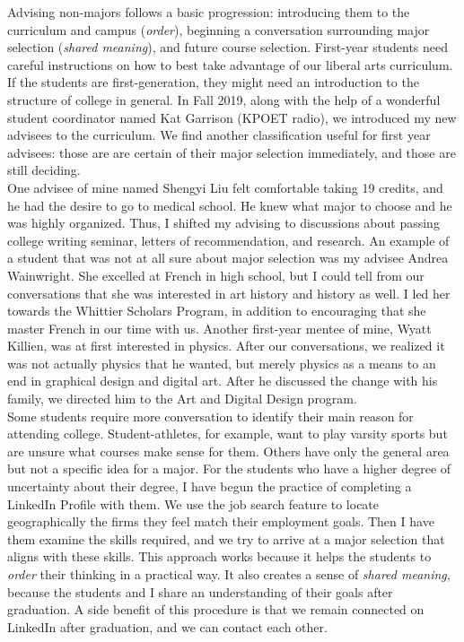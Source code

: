 \documentclass[../../../main.tex]{subfiles}
\begin{document}
Advising non-majors follows a basic progression: introducing them to the curriculum and campus (\textit{order}), beginning a conversation surrounding major selection (\textit{shared meaning}), and future course selection.  First-year students need careful instructions on how to best take advantage of our liberal arts curriculum.  If the students are first-generation, they might need an introduction to the structure of college in general.  In Fall 2019, along with the help of a wonderful student coordinator named Kat Garrison (KPOET radio), we introduced my new advisees to the curriculum.  We find another classification useful for first year advisees: those are are certain of their major selection immediately, and those are still deciding.
\\
\vspace{0.25cm}
One advisee of mine named Shengyi Liu felt comfortable taking 19 credits, and he had the desire to go to medical school.  He knew what major to choose and he was highly organized.  Thus, I shifted my advising to discussions about passing college writing seminar, letters of recommendation, and research.  An example of a student that was not at all sure about major selection was my advisee Andrea Wainwright.  She excelled at French in high school, but I could tell from our conversations that she was interested in art history and history as well.  I led her towards the Whittier Scholars Program, in addition to encouraging that she master French in our time with us.  Another first-year mentee of mine, Wyatt Killien, was at first interested in physics.  After our conversations, we realized it was not actually physics that he wanted, but merely physics as a means to an end in graphical design and digital art.  After he discussed the change with his family, we directed him to the Art and Digital Design program.
\\
\vspace{0.25cm}
Some students require more conversation to identify their main reason for attending college.  Student-athletes, for example, want to play varsity sports but are unsure what courses make sense for them.  Others have only the general area but not a specific idea for a major.  For the students who have a higher degree of uncertainty about their degree, I have begun the practice of completing a LinkedIn Profile with them.  We use the job search feature to locate geographically the firms they feel match their employment goals.  Then I have them examine the skills required, and we try to arrive at a major selection that aligns with these skills.  This approach works because it helps the students to \textit{order} their thinking in a practical way.  It also creates a sense of \textit{shared meaning}, because the students and I share an understanding of their goals after graduation.  A side benefit of this procedure is that we remain connected on LinkedIn after graduation, and we can contact each other.
\end{document}
